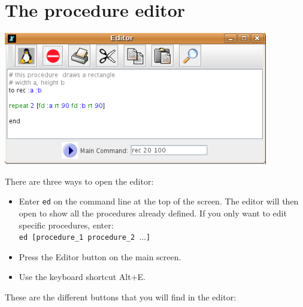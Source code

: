 \section{The procedure editor}
\begin{center}
 \includegraphics[scale=0.4]{pics/interface-CaptureEditor.png}
\end{center}
There are three ways to open the editor:\\
\begin{itemize}
\item Enter \texttt{ed} on the command line at the top of the screen. The
editor will then open to show all the procedures already defined.
If you only want to edit specific procedures, enter:\\
 \texttt{ed {[}procedure\_1 procedure\_2 $\ldots$]}
\item Press the Editor button on the main screen. 
\item Use the keyboard shortcut Alt+E. 
\end{itemize}
These are the different buttons that you will find in the editor:\\

